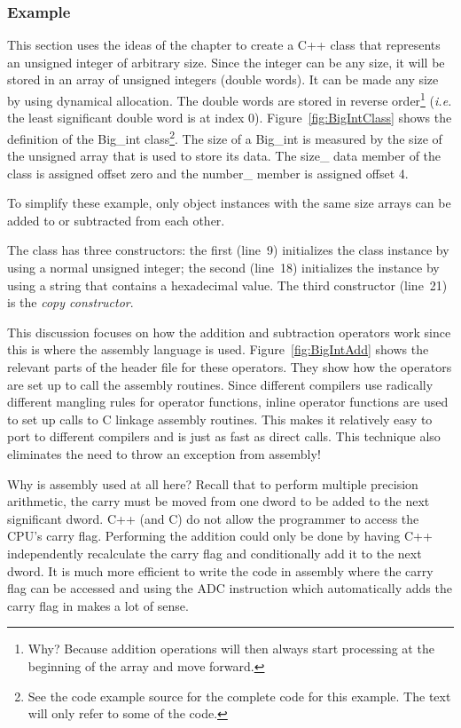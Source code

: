 \subsubsection{Example}
This section uses the ideas of the chapter to create a C++ class that
represents an unsigned integer of arbitrary size. Since the integer
can be any size, it will be stored in an array of unsigned integers
(double words). It can be made any size by using dynamical
allocation. The double words are stored in reverse order\footnote{Why?
Because addition operations will then always start processing at the
beginning of the array and move forward.}  (\emph{i.e.} the least
significant double word is at index 0).  Figure~\ref{fig:BigIntClass}
shows the definition of the {\code Big\_int} class\footnote{See the
code example source for the complete code for this example. The text
will only refer to some of the code.}. The size of a {\code Big\_int}
is measured by the size of the {\code unsigned} array that is used to
store its data. The {\code size\_} data member of the class is
assigned offset zero and the {\code number\_} member is assigned
offset 4.

To simplify these example, only object instances with the same size
arrays can be added to or subtracted from each other.

The class has three constructors: the first (line~9) initializes the
class instance by using a normal unsigned integer; the second
(line~18) initializes the instance by using a string that contains a
hexadecimal value. The third constructor (line~21) is the \emph{copy
constructor}.

This discussion focuses on how the addition and subtraction operators
work since this is where the assembly language is
used. Figure~\ref{fig:BigIntAdd} shows the relevant parts of the
header file for these operators. They show how the operators are set
up to call the assembly routines. Since different compilers use
radically different mangling rules for operator functions, inline
operator functions are used to set up calls to C linkage assembly
routines. This makes it relatively easy to port to different compilers
and is just as fast as direct calls. This technique also eliminates the
need to throw an exception from assembly!

Why is assembly used at all here? Recall that to perform multiple
precision arithmetic, the carry must be moved from one dword to be
added to the next significant dword. C++ (and C) do not allow the
programmer to access the CPU's carry flag. Performing the addition could
only be done by having C++ independently recalculate the carry flag
and conditionally add it to the next dword. It is much more efficient
to write the code in assembly where the carry flag can be accessed and
using the {\code ADC} instruction which automatically adds the carry
flag in makes a lot of sense.

